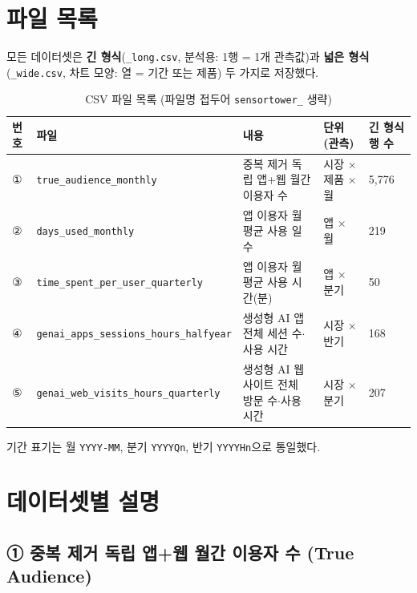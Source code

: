 \documentclass[11pt]{article}
\begin{document}
\section{파일 목록}

모든 데이터셋은 \textbf{긴 형식}(\texttt{\_long.csv}, 분석용: 1행 = 1개 관측값)과 \textbf{넓은 형식}(\texttt{\_wide.csv}, 차트 모양: 열 = 기간 또는 제품) 두 가지로 저장했다.

\begin{longtable}{L{0.9cm}L{5.0cm}L{4.4cm}L{2.6cm}L{1.7cm}}
\caption{CSV 파일 목록 (파일명 접두어 \texttt{sensortower\_} 생략)}\label{tab:files}\\
\toprule
번호 & 파일 & 내용 & 단위(관측) & 긴 형식 행 수 \\
\midrule
\endhead
① & \texttt{true\_audience\_monthly} & 중복 제거 독립 앱+웹 월간 이용자 수 & 시장 $\times$ 제품 $\times$ 월 & 5,776 \\
② & \texttt{days\_used\_monthly} & 앱 이용자 월평균 사용 일수 & 앱 $\times$ 월 & 219 \\
③ & \texttt{time\_spent\_per\_user\_quarterly} & 앱 이용자 월평균 사용 시간(분) & 앱 $\times$ 분기 & 50 \\
④ & \texttt{genai\_apps\_sessions\_hours\_halfyear} & 생성형 AI 앱 전체 세션 수$\cdot$사용 시간 & 시장 $\times$ 반기 & 168 \\
⑤ & \texttt{genai\_web\_visits\_hours\_quarterly} & 생성형 AI 웹사이트 전체 방문 수$\cdot$사용 시간 & 시장 $\times$ 분기 & 207 \\
\bottomrule
\end{longtable}

기간 표기는 월 \texttt{YYYY-MM}, 분기 \texttt{YYYYQn}, 반기 \texttt{YYYYHn}으로 통일했다.

\section{데이터셋별 설명}

\subsection{① 중복 제거 독립 앱+웹 월간 이용자 수 (True Audience)}
\end{document}
